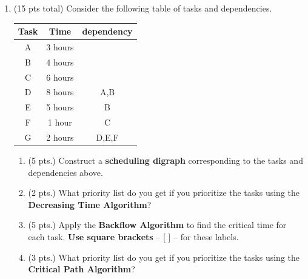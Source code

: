 \documentclass[12pt]{article}
\renewcommand{\emph}[1]{\textsf{\textbf{#1}}}
\begin{document}
\begin{enumerate}
\begin{enumerate}
\end{enumerate}

\newpage
\item (15 pts total) Consider the following table of tasks and
dependencies.

\begin{tabular}{c | c | c}
Task & Time & dependency\\
\hline
A & 3 hours & \\
B & 4 hours & \\
C & 6 hours & \\
D & 8 hours & A,B\\
E & 5 hours & B \\
F & 1 hour & C\\
G & 2 hours & D,E,F \\
\end{tabular}

\begin{enumerate}
\item (5 pts.) Construct a {\bf scheduling digraph} corresponding to the
  tasks and dependencies above.\\
  
  \vfill
\item (2 pts.) What priority list do you get if you prioritize the tasks using
the {\bf Decreasing Time Algorithm}?\\

\vspace{1in}
\item (5 pts.) Apply the {\bf
    Backflow Algorithm} to find the critical time for each task. \emph{Use square brackets} -- [ ] -- for these labels.\\
    
    
\item (3 pts.) What priority list do you get if you prioritize the tasks using
  the {\bf Critical Path Algorithm}?\\
  \vspace{1in}
\end{enumerate}

\newpage


\def\r{1}
\def\s{.9}
\newcommand{\anotherdigraph}{\begin{tikzpicture}[vtx/.style={draw, circle, inner sep = 3pt, %
}, myto/.style={-latex, shorten >=2pt, shorten <=2pt
}, node distance = \r cm]


\end{tikzpicture}}
\end{enumerate}
\end{document}
